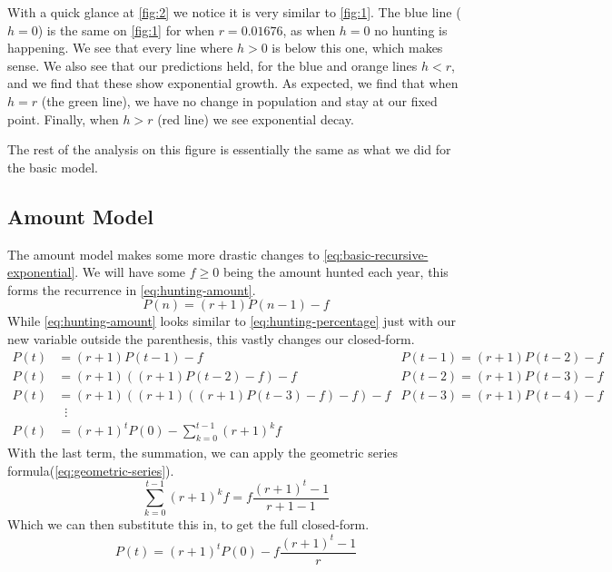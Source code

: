 \documentclass{article}
\begin{document}


With a quick glance at \cref{fig:2} we notice it is very similar to \cref{fig:1}. The blue line ($h=0$) is the same on \cref{fig:1} for when $r=0.01676$, as when $h=0$ no hunting is happening. We see that every line where $h > 0$ is below this one, which makes sense. We also see that our predictions held, for the blue and orange lines $h < r$, and we find that these show exponential growth. As expected, we find that when $h=r$ (the green line), we have no change in population and stay at our fixed point. Finally, when $h > r$ (red line) we see exponential decay.

The rest of the analysis on this figure is essentially the same as what we did for the basic model.

\subsection{Amount Model}
The amount model makes some more drastic changes to \cref{eq:basic-recursive-exponential}. We will have some $f \ge 0$ being the amount hunted each year, this forms the recurrence in \cref{eq:hunting-amount}.
\begin{equation}\label{eq:hunting-amount}
    P(n) = (r+1)P(n-1) - f
\end{equation}
While \eqref{eq:hunting-amount} looks similar to \cref{eq:hunting-percentage} just with our new variable outside the parenthesis, this vastly changes our closed-form.
\begin{align*}
    P(t) &= (r+1)P(t-1) - f & P(t-1) = (r+1)P(t-2) - f \\
    P(t) &= (r+1)((r+1)P(t-2) - f) - f & P(t-2) = (r+1)P(t-3) - f \\
    P(t) &= (r+1)((r+1)((r+1)P(t-3) - f) - f) - f & P(t-3) = (r+1)P(t-4) - f \\
    &\phantom{x}\vdots \\
    P(t) &= (r+1)^tP(0) - \sum_{k=0}^{t-1}(r+1)^kf
\end{align*}
With the last term, the summation, we can apply the geometric series formula(\cref{eq:geometric-series}).
\begin{equation*}
    \sum_{k=0}^{t-1}(r+1)^kf = f\frac{(r+1)^t-1}{r+1-1}
\end{equation*}
Which we can then substitute this in, to get the full closed-form.
\begin{equation}\label{eq:hunting-amount-closed}
     P(t) = (r+1)^tP(0)-f\frac{(r+1)^t-1}{r}
\end{equation}
\end{document}
